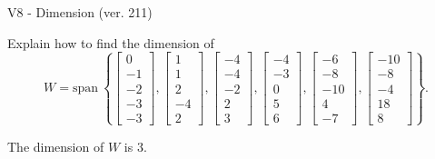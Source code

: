 \begin{exercise}
  \begin{exerciseTitle}V8 - Dimension (ver. 211)\end{exerciseTitle}
  \begin{exerciseStatement}
    Explain how to find the dimension of 
\[W=\mathrm{span}\ \left\{\left[\begin{array}{r}
0 \\
-1 \\
-2 \\
-3 \\
-3
\end{array}\right] , \left[\begin{array}{r}
1 \\
1 \\
2 \\
-4 \\
2
\end{array}\right] , \left[\begin{array}{r}
-4 \\
-4 \\
-2 \\
2 \\
3
\end{array}\right] , \left[\begin{array}{r}
-4 \\
-3 \\
0 \\
5 \\
6
\end{array}\right] , \left[\begin{array}{r}
-6 \\
-8 \\
-10 \\
4 \\
-7
\end{array}\right] , \left[\begin{array}{r}
-10 \\
-8 \\
-4 \\
18 \\
8
\end{array}\right]\right\}.\]



  \end{exerciseStatement}
  \begin{exerciseAnswer}
   The dimension of \(W\) is  \(3\).
  


  \end{exerciseAnswer}
\end{exercise}